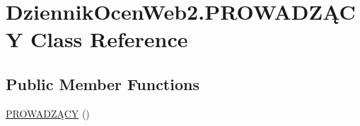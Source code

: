 \hypertarget{class_dziennik_ocen_web2_1_1_p_r_o_w_a_d_z_xC4_x84_c_y}{}\section{Dziennik\+Ocen\+Web2.\+P\+R\+O\+W\+A\+D\+ZĄ\+CY Class Reference}
\label{class_dziennik_ocen_web2_1_1_p_r_o_w_a_d_z_xC4_x84_c_y}
\subsection*{Public Member Functions}
\begin{DoxyCompactItemize}
\item 
\hyperlink{class_dziennik_ocen_web2_1_1_p_r_o_w_a_d_z_xC4_x84_c_y_a1408a85fb69942d77971bcac8a376a9c}{P\+R\+O\+W\+A\+D\+ZĄ\+CY} ()
\end{DoxyCompactItemize}
